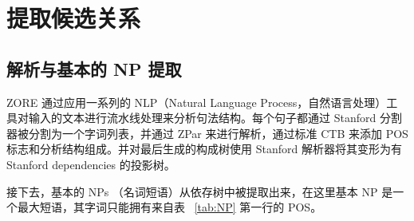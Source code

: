\section{提取候选关系}

\subsection{解析与基本的 NP 提取}
ZORE 通过应用一系列的 NLP（Natural Language Process，自然语言处理）工具对输入的文本进行流水线处理来分析句法结构。每个句子都通过 Stanford 分割器\citep{chang2008}被分割为一个字词列表，并通过 ZPar \citep{zhang2011}来进行解析，通过标准 CTB \citep{xue2005}来添加 POS 标志和分析结构组成。并对最后生成的构成树使用 Stanford 解析器\citep{chang2008}将其变形为有 Stanford dependencies 的投影树。

接下去，基本的 NPs （名词短语）从依存树中被提取出来，在这里基本 NP 是一个最大短语，其字词只能拥有来自表 ~\ref{tab:NP} 第一行的 POS。

